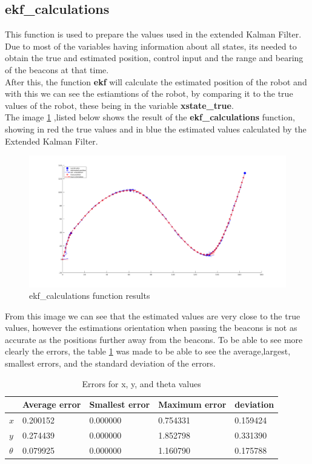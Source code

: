 \documentclass[runningheads]{llncs}
\begin{document}
\subsection*{ekf\_calculations}
This function is used to prepare the values used in the extended Kalman Filter. Due to most of the variables having information about all states, its needed to obtain the true and estimated position, control input and the range and bearing of the beacons at that time.\\
After this, the function \textbf{ekf} will calculate the estimated position of the robot and with this we can see the estiamtions of the robot, by comparing it to the true values of the robot, these being in the variable \textbf{xstate\_true}.
\\The image \ref*{ekf_calculations_fig} ,listed below shows the result of the \textbf{ekf\_calculations} function, showing in red the true values and in blue the estimated values calculated by the Extended Kalman Filter.

\begin{figure}
    \centering
    \includegraphics[width=\textwidth]{ekf_calculationspng.png}
    \caption{ekf\_calculations function results}
    \label{ekf_calculations_fig}
\end{figure}


From this image we can see that the estimated values are very close to the true values,
however the estimations orientation when passing the beacons is not as accurate as the positions further away from the beacons.
To be able to see more clearly the errors, the table \ref{errors table}  was made to be able to see the average,largest, smallest errors, and the standard deviation of the errors.
\begin{table}[h]
    \centering
    \caption{Errors for x, y, and theta values}
    \label{errors table}
    \begin{tabular}{|l|l|l|l|l|}
    \hline
    & Average error & Smallest error & Maximum error & deviation \\ \hline
    $x$ & 0.200152 & 0.000000 & 0.754331  & 0.159424 \\ \hline
    $y$ & 0.274439 & 0.000000 & 1.852798 & 0.331390  \\ \hline
    $\theta$ & 0.079925 & 0.000000 & 1.160790 & 0.175788 \\\hline
    \end{tabular}
    \end{table}
\end{document}
